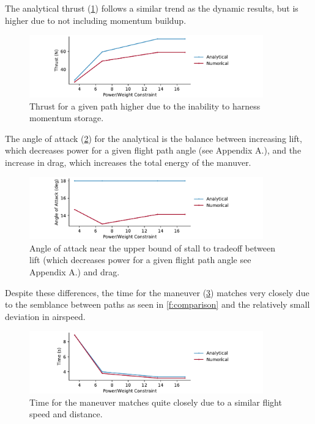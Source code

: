 \documentclass[10pt,english]{article}
\begin{document}
The analytical thrust (\cref{f:T_compare}) follows a similar trend as the dynamic results, but is higher due to not including momentum buildup.  

\begin{figure}[H]
\centering
\includegraphics[trim={.7cm 0.0cm .7cm 0cm},clip,width=0.9\textwidth]{T_compare}
\vspace{-5pt}
\caption{Thrust for a given path higher due to the inability to harness momentum storage.}
\label{f:T_compare}
\end{figure}

The angle of attack (\cref{f:alpha_compare}) for the analytical is the balance between increasing lift, which decreases power for a given flight path angle (see Appendix A.),  and the increase in drag, which increases the total energy of the manuver.  

\begin{figure}[H]
\centering
\includegraphics[trim={.7cm 0.0cm .7cm 0cm},clip,width=0.9\textwidth]{alpha_compare}
\vspace{-5pt}
\caption{Angle of attack near the upper bound of stall to tradeoff between lift (which decreases power for a given flight path angle see Appendix A.) and drag.}
\label{f:alpha_compare}
\end{figure}

Despite these differences, the time for the maneuver (\cref{f:t_compare}) matches very closely due to the semblance between paths as seen in \cref{f:comparison} and the relatively small deviation in airspeed. 


\begin{figure}[H]
\centering
\includegraphics[trim={.7cm 0.0cm .7cm 0cm},clip,width=0.9\textwidth]{time_compare}
\vspace{-5pt}
\caption{Time for the maneuver matches quite closely due to a similar flight speed and distance.}
\label{f:t_compare}
\end{figure}
\end{document}
